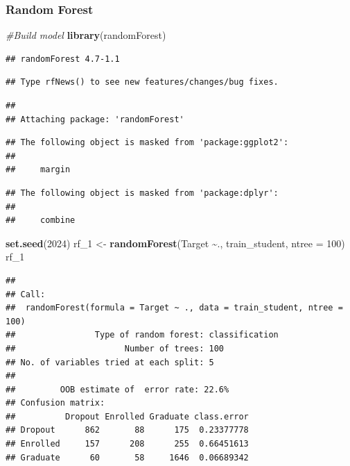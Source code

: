 \documentclass[
]{article}
\newenvironment{Shaded}{\begin{snugshade}}{\end{snugshade}}
\newcommand{\AttributeTok}[1]{\textcolor[rgb]{0.13,0.29,0.53}{#1}}
\newcommand{\CommentTok}[1]{\textcolor[rgb]{0.56,0.35,0.01}{\textit{#1}}}
\newcommand{\DecValTok}[1]{\textcolor[rgb]{0.00,0.00,0.81}{#1}}
\newcommand{\FunctionTok}[1]{\textcolor[rgb]{0.13,0.29,0.53}{\textbf{#1}}}
\newcommand{\NormalTok}[1]{#1}
\newcommand{\OtherTok}[1]{\textcolor[rgb]{0.56,0.35,0.01}{#1}}
\newcommand{\SpecialCharTok}[1]{\textcolor[rgb]{0.81,0.36,0.00}{\textbf{#1}}}
\begin{document}
\hypertarget{random-forest}{%
\subsubsection{Random Forest}\label{random-forest}}

\begin{Shaded}
\begin{Highlighting}[]
\CommentTok{\#Build model}
\FunctionTok{library}\NormalTok{(randomForest)}
\end{Highlighting}
\end{Shaded}

\begin{verbatim}
## randomForest 4.7-1.1
\end{verbatim}

\begin{verbatim}
## Type rfNews() to see new features/changes/bug fixes.
\end{verbatim}

\begin{verbatim}
## 
## Attaching package: 'randomForest'
\end{verbatim}

\begin{verbatim}
## The following object is masked from 'package:ggplot2':
## 
##     margin
\end{verbatim}

\begin{verbatim}
## The following object is masked from 'package:dplyr':
## 
##     combine
\end{verbatim}

\begin{Shaded}
\begin{Highlighting}[]
\FunctionTok{set.seed}\NormalTok{(}\DecValTok{2024}\NormalTok{)}
\NormalTok{rf\_1 }\OtherTok{\textless{}{-}} \FunctionTok{randomForest}\NormalTok{(Target }\SpecialCharTok{\textasciitilde{}}\NormalTok{., train\_student, }\AttributeTok{ntree =} \DecValTok{100}\NormalTok{)}
\NormalTok{rf\_1}
\end{Highlighting}
\end{Shaded}

\begin{verbatim}
## 
## Call:
##  randomForest(formula = Target ~ ., data = train_student, ntree = 100) 
##                Type of random forest: classification
##                      Number of trees: 100
## No. of variables tried at each split: 5
## 
##         OOB estimate of  error rate: 22.6%
## Confusion matrix:
##          Dropout Enrolled Graduate class.error
## Dropout      862       88      175  0.23377778
## Enrolled     157      208      255  0.66451613
## Graduate      60       58     1646  0.06689342
\end{verbatim}
\end{document}
